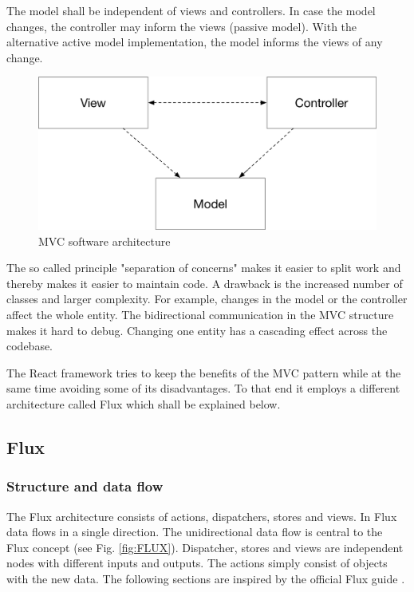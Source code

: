 The model shall be independent of views and controllers. In case the model changes, 
the controller may inform the views (passive model). With the alternative active model 
implementation, the model informs the views of any change.

\begin{figure}[H]
	\centering
	\includegraphics[scale=0.6]{bilder/grundlagen/MVC.png}
	\caption{MVC  software architecture  \cite{GOLL}}
	\label{fig:MVC}
\end{figure}

The so called principle "separation of concerns" makes it easier to split work and thereby 
makes it easier to maintain code.
A drawback is the increased number of classes and larger complexity.
For example,  changes in the model or the controller affect the whole entity. 
The bidirectional communication in the MVC structure makes it hard to debug.
Changing one entity has a cascading effect across the codebase.

The React framework tries to keep the benefits of the MVC pattern while at the same time 
avoiding some of its disadvantages. To that end it employs a different architecture called
Flux which shall be explained below.

\subsection{Flux}

\subsubsection{Structure and data flow}
The Flux architecture consists of actions, dispatchers, stores and views. In Flux data flows in a single direction.
The unidirectional data flow is central to the Flux concept (see Fig. \ref{fig:FLUX}).
Dispatcher, stores and views are independent nodes with different inputs and outputs. The actions simply consist of objects with the new data. The following sections are inspired by the official Flux guide \cite{Flux}. 

